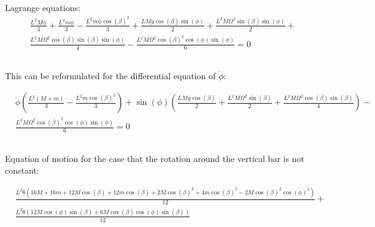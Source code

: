 \subsection{}
Lagrange equations:
\begin{equation}
    \begin{split}
        &\frac{L^2M\mathrm{\ddot{\phi}}}{3}+\frac{L^2m\mathrm{\ddot{\phi}}}{3}-\frac{L^2m\mathrm{\ddot{\phi}}{\cos\left(\beta \right)}^2}{3}+\frac{LMg\cos\left(\beta \right)\sin\left(\phi \right)}{2}+\frac{L^2M\Omega ^2\sin\left(\beta \right)\sin\left(\phi \right)}{2}+\\
        &\frac{L^2M\Omega ^2\cos\left(\beta \right)\sin\left(\beta \right)\sin\left(\phi \right)}{4}-\frac{L^2M\Omega ^2{\cos\left(\beta \right)}^2\cos\left(\phi \right)\sin\left(\phi \right)}{6} = 0
    \end{split}
\end{equation}
\subsection{}
This can be reformulated for the differential equation of $\ddot{\phi}$:

\begin{equation}
    \begin{split}
        &\ddot{\phi} \left(\frac{L^2(M+m)}{3} - \frac{L^2m\cos(\beta)^2}{3}\right) + \sin(\phi)\left(\frac{LMg\cos(\beta)}{2} + \frac{L^2M\Omega^2\sin(\beta)}{2} + \frac{L^2M\Omega^2\cos(\beta)\sin(\beta)}{4}\right) - \\
        &\frac{L^2M\Omega^2\cos(\beta)^2\cos(\phi)\sin(\phi)}{6} = 0
    \end{split}
\end{equation}

\subsection{}
Equation of motion for the case that the rotation around the vertical bar is not constant:

\begin{equation}
    \begin{split}
        &\frac{L^2\mathrm{\ddot{\theta}}\left(16M+16m+12M\cos\left(\beta \right)+12m\cos\left(\beta \right)+2M{\cos\left(\beta \right)}^2+4m{\cos\left(\beta \right)}^2-2M{\cos\left(\beta \right)}^2{\cos\left(\phi \right)}^2\right)}{12}+\\
        &\frac{L^2\mathrm{\ddot{\theta}}\left(12M\cos\left(\phi \right)\sin\left(\beta \right)+6M\cos\left(\beta \right)\cos\left(\phi \right)\sin\left(\beta \right)\right)}{12}
    \end{split}
\end{equation}


